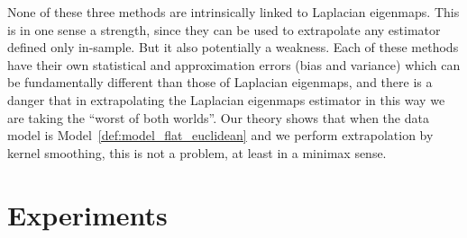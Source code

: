 \documentclass{article}
\newcommand{\Reals}{\mathbb{R}}
\newcommand{\1}{\mathbf{1}}
\newcommand{\mc}[1]{\mathcal{#1}}
\theoremstyle{alden}
\theoremstyle{aldenthm}
\theoremstyle{definition}
\theoremstyle{remark}
\begin{document}
\begin{itemize}
	None of these three methods are intrinsically linked to Laplacian eigenmaps. This is in one sense a strength, since they can be used to extrapolate any estimator defined only in-sample. But it also potentially a weakness. Each of these methods have their own statistical and approximation errors (bias and variance) which can be fundamentally different than those of Laplacian eigenmaps, and there is a danger that in extrapolating the Laplacian eigenmaps estimator in this way we are taking the ``worst of both worlds''. Our theory shows that when the data model is Model~\ref{def:model_flat_euclidean} and we perform extrapolation by kernel smoothing, this is not a problem, at least in a minimax sense. 
	
\end{itemize}

\section{Experiments}
\label{sec:experiments}
\end{document}
